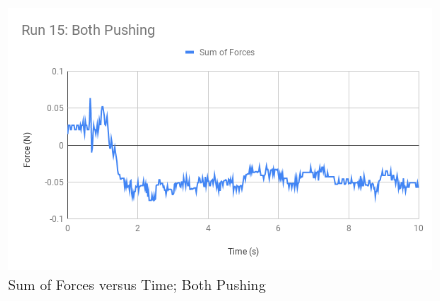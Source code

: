 %
\begin{figure}[ht]
    \centering
    \includegraphics[scale=0.71]{image/05-third-law/Run-15-Both-Pushing.png}
    \caption{Sum of Forces versus Time; Both Pushing}
    \label{figure:05.sf.B}
\end{figure}
%
